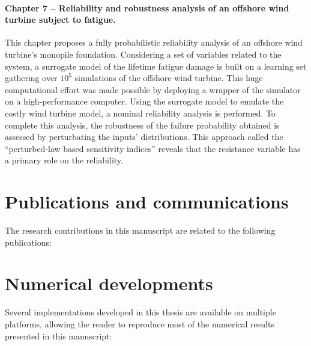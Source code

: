 \paragraph{Chapter 7 -- Reliability and robustness analysis of an offshore wind turbine subject to fatigue.} 
This chapter proposes a fully probabilistic reliability analysis of an offshore wind turbine's monopile foundation. 
Considering a set of variables related to the system, a surrogate model of the lifetime fatigue damage is built on a learning set gathering over $10^5$ simulations of the offshore wind turbine.  
This huge computational effort was made possible by deploying a wrapper of the simulator on a high-performance computer.   
Using the surrogate model to emulate the costly wind turbine model, a nominal reliability analysis is performed. 
To complete this analysis, the robustness of the failure probability obtained is assessed by perturbating the inputs' distributions. 
This approach called the ``perturbed-law based sensitivity indices'' \citep{lemaitre_2015_PLI} reveals that the resistance variable has a primary role on the reliability. 


\clearpage

\section*{Publications and communications}

The research contributions in this manuscript are related to the following publications: 



\section*{Numerical developments}

Several implementations developed in this thesis are available on multiple platforms, allowing the reader to reproduce most of the numerical results presented in this manuscript:  

